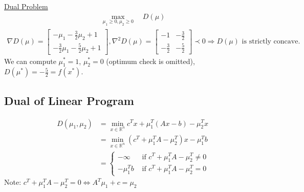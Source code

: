 \documentclass[11pt,a4paper]{article}
\begin{document}
\underline{Dual Problem}
\begin{equation}
    \begin{aligned}
        \max_{\mu_1\geq 0,\mu_2\geq 0}\quad D(\mu)
    \end{aligned}
    \nonumber
\end{equation}
\begin{equation}
    \begin{aligned}
        \nabla D(\mu)=\begin{bmatrix}
            -\mu_1-\frac{3}{2}\mu_2+1\\
            -\frac{3}{2}\mu_1-\frac{5}{2}\mu_2+1
        \end{bmatrix},
        \nabla^2 D(\mu)=\begin{bmatrix}
            -1&-\frac{3}{2}\\
            -\frac{3}{2}&-\frac{5}{2}
        \end{bmatrix}\prec 0 \Rightarrow D(\mu)\text{ is strictly concave.}
    \end{aligned}
    \nonumber
\end{equation}
We can compute $\mu_1^*=1$, $\mu_2^*=0$ (optimum check is omitted), $D(\mu^*)=-\frac{5}{2}=f(x^*)$.

\subsection{Dual of Linear Program}
\begin{center}
\end{center}
\begin{equation}
    \begin{aligned}
        D(\mu_1,\mu_2)
        &=\min_{x\in \mathbb{R}^n}c^Tx+\mu_1^T(Ax-b)-\mu_2^Tx\\
        &=\min_{x\in \mathbb{R}^n}(c^T+\mu_1^TA-\mu_2^T)x-\mu_1^Tb\\
        &=\left\{\begin{matrix}
            -\infty&\text{ if }c^T+\mu_1^TA-\mu_2^T\neq 0\\
            -\mu_1^Tb&\text{ if }c^T+\mu_1^TA-\mu_2^T=0
        \end{matrix}\right.
    \end{aligned}
    \nonumber
\end{equation}
Note: $c^T+\mu_1^TA-\mu_2^T=0 \Leftrightarrow A^T\mu_1+c=\mu_2$
\end{document}

